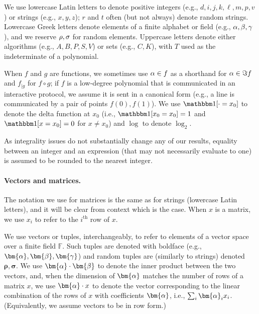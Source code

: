 \documentclass[10pt,a4paper]{article}
\newif\iflipics\lipicsfalse
\theoremstyle{definition}
\newcommand{\field}{\mathbb{F}}
\newcommand{\vcommitlength}{v}
\newcommand{\vcommitstring}{z}
\newcommand{\pcommitlength}{p}
\newcommand{\pcommitstring}{y}
\newcommand{\dimension}{m}
\newcommand{\degree}{d}
\newcommand{\evaluationpoint}{\bm{\fe2}}
\newcommand{\fingerprinttuple}{\bm{\rho}}
\newcommand{\Fingerprinttuple}{\bm{\sigma}}
\newcommand{\chf}{\mathbbm 1}
\def\fe#1{
    \ifnum#1=1
        \alpha
    \else
    \ifnum#1=2
        \beta
    \else
    \ifnum#1=3
        \gamma
    \fi\fi\fi
}
\def\rfe#1{
    \ifnum#1=1
        \rho
    \else
    \ifnum#1=2
        \sigma
    \else
    \fi\fi
}
\begin{document}
    We use lowercase Latin letters to denote positive integers (e.g., $\degree, i, j, k, \ell, \dimension, \pcommitlength, \vcommitlength$) or strings (e.g., $x, \pcommitstring, \vcommitstring$); $r$ and $t$ often (but not always) denote random strings. Lowercase Greek letters denote elements of a finite alphabet or field (e.g., $\fe1, \fe2, \fe3$), and we reserve $\rfe1, \rfe2$ for random elements. 
    Uppercase letters denote either algorithms (e.g., $A, B, P, S, V$) or sets (e.g., $C, K$), with $T$ used as the indeterminate of a polynomial.
    
    When $f$ and $g$ are functions, we sometimes use $\fe1 \in f$ as a shorthand for $\fe1 \in \Im f$ and $f_{|g}$ for $f \circ g$; if $f$ is a low-degree polynomial that is communicated in an interactive protocol, we assume it is sent in a canonical form (e.g., a line is communicated by a pair of points $f(0), f(1)$). We use $\chf[\cdot = x_0]$ to denote the delta function at $x_0$ (i.e., $\chf[x_0 = x_0] = 1$ and $\chf[x = x_0] = 0$ for $x \neq x_0$) and $\log$ to denote $\log_2$.
    
    As integrality issues do not substantially change any of our results, equality between an integer and an expression (that may not necessarily evaluate to one) is assumed to be rounded to the nearest integer.
    
    \paragraph*{Vectors and matrices\iflipics\else.\fi} The notation we use for matrices is the same as for strings (lowercase Latin letters), and it will be clear from context which is the case. When $x$ is a matrix, we use $x_i$ to refer to the $i^\text{th}$ row of $x$.
    
    We use vectors or tuples, interchangeably, to refer to elements of a vector space over a finite field $\field$. Such tuples are denoted with boldface (e.g., $\bm{\fe1}, \evaluationpoint, \bm{\fe3}$) and random tuples are (similarly to strings) denoted $\fingerprinttuple, \Fingerprinttuple$. We use $\bm{\fe1} \cdot \bm{\fe2}$ to denote the inner product between the two vectors, and, when the dimension of $\bm{\fe1}$ matches the number of rows of a matrix $x$, we use $\bm{\fe1} \cdot x$ to denote the vector corresponding to the linear combination of the rows of $x$ with coefficients $\bm{\fe1}$, i.e., $\sum_i \bm{\fe1}_i x_i$. (Equivalently, we assume vectors to be in row form.)
    
\end{document}
